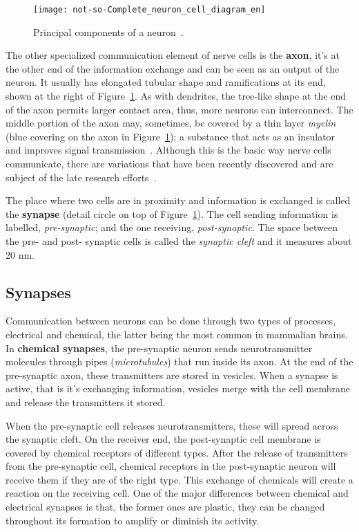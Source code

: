 \begin{figure}
  \begin{center}
    \texttt{[image: not-so-Complete\_neuron\_cell\_diagram\_en]}
    \caption{Principal components of a neuron~\cite{wikipedia-images}.}
    \label{fig:neuro:neuron-anatomy}
  \end{center}
\end{figure}

The other specialized communication element of nerve cells is the \textbf{axon}, it's at the other end of the information exchange and can be seen as an output of the neuron. It usually has elongated tubular shape and ramifications at its end, shown at the right of Figure~\ref{fig:neuro:neuron-anatomy}. As with dendrites, the tree-like shape at the end of the axon permits larger contact area, thus, more neurons can interconnect. The middle portion of the axon may, sometimes, be covered by a thin layer \emph{myelin} (blue covering on the axon in Figure~\ref{fig:neuro:neuron-anatomy}); a substance that acts as an insulator and improves signal transmission~\cite{thompson2000brain}. Although this is the basic way nerve cells communicate, there are variations that have been recently discovered and are subject of the late research efforts~\cite{Bullock04112005}.

The place where two cells are in proximity and information is exchanged is called the \textbf{synapse} (detail circle on top of Figure~\ref{fig:neuro:neuron-anatomy}). The cell sending information is labelled, \emph{pre-synaptic}; and the one receiving, \emph{post-synaptic}. The space between the pre- and post- synaptic cells is called the \emph{synaptic cleft} and it measures about 20 nm. 

\subsection{Synapses}

Communication between neurons can be done through two types of processes, electrical and chemical, the latter being the most common in mammalian brains. In \textbf{chemical synapses}, the pre-synaptic neuron sends neurotransmitter molecules through pipes (\emph{microtubules}) that run inside its axon. At the end of the pre-synaptic axon, these transmitters are stored in vesicles. When a synapse is active, that is it's exchanging information, vesicles merge with the cell membrane and release the transmitters it stored.

When the pre-synaptic cell releases neurotransmitters, these will spread across the synaptic cleft. On the receiver end, the post-synaptic cell membrane is covered by chemical receptors of different types. After the release of transmitters from the pre-synaptic cell, chemical receptors in the post-synaptic neuron will receive them if they are of the right type. This exchange of chemicals will create a reaction on the receiving cell. One of the major differences between chemical and electrical synapses is that, the former ones are plastic, they can be changed throughout its formation to amplify or diminish its activity.

